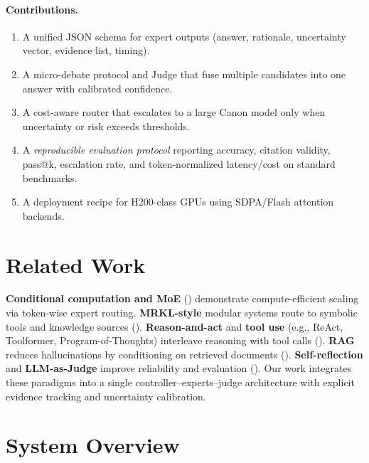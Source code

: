 \documentclass[11pt]{article}
\begin{document}
\paragraph{Contributions.}
\begin{enumerate}[leftmargin=*, itemsep=2pt]
  \item A unified JSON schema for expert outputs (answer, rationale, uncertainty vector, evidence list, timing).
  \item A micro-debate protocol and Judge that fuse multiple candidates into one answer with calibrated confidence.
  \item A cost-aware router that escalates to a large Canon model only when uncertainty or risk exceeds thresholds.
  \item A \emph{reproducible evaluation protocol} reporting accuracy, citation validity, pass@k, escalation rate, and token-normalized latency/cost on standard benchmarks.
  \item A deployment recipe for H200-class GPUs using SDPA/Flash attention backends.
\end{enumerate}

\section{Related Work}
\textbf{Conditional computation and MoE} (\cite{shazeer2017moe, fedus2021switch}) demonstrate compute-efficient scaling via token-wise expert routing. \textbf{MRKL-style} modular systems route to symbolic tools and knowledge sources (\cite{karpas2022mrkl}). \textbf{Reason-and-act} and \textbf{tool use} (e.g., ReAct, Toolformer, Program-of-Thoughts) interleave reasoning with tool calls (\cite{yao2023react, schick2023toolformer, chen2022program}). \textbf{RAG} reduces hallucinations by conditioning on retrieved documents (\cite{lewis2020rag}). \textbf{Self-reflection} and \textbf{LLM-as-Judge} improve reliability and evaluation (\cite{shinn2023reflexion, zheng2023judge}). Our work integrates these paradigms into a single controller--experts--judge architecture with explicit evidence tracking and uncertainty calibration.

\section{System Overview}
\end{document}

